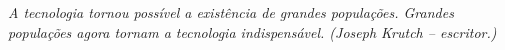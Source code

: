 
\renewcommand{\epigraphname}{EPÍGRAFE}

\begin{epigrafe}

\textit{A tecnologia tornou possível a existência de grandes populações. Grandes populações agora tornam a tecnologia indispensável. (Joseph Krutch – escritor.)}

\end{epigrafe}


